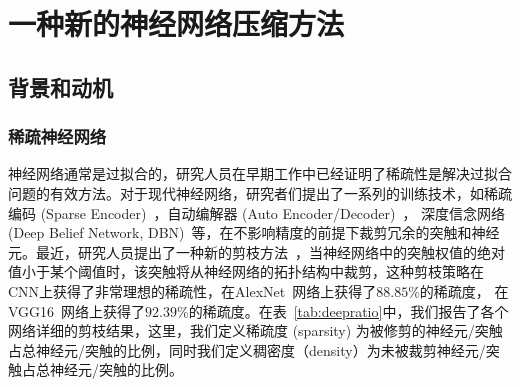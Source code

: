 \chapter{一种新的神经网络压缩方法}





\section{背景和动机}

\subsection{稀疏神经网络}
神经网络通常是过拟合的，研究人员在早期工作中已经证明了稀疏性是解决过拟合问题的有效方法。对于现代神经网络，研究者们提出了一系列的训练技术，如稀疏编码 (Sparse Encoder)~\cite{olshausen1996emergence}，自动编解器 (Auto Encoder/Decoder)~\cite{boureau2008sparse,lee2008sparse}， 深度信念网络 (Deep Belief Network, DBN)~\cite{lee2007efficient}等，在不影响精度的前提下裁剪冗余的突触和神经元。最近，研究人员提出了一种新的剪枝方法~\cite{han2015learning}，当神经网络中的突触权值的绝对值小于某个阈值时，该突触将从神经网络的拓扑结构中裁剪，这种剪枝策略在CNN上获得了非常理想的稀疏性，在AlexNet~\cite{krizhevsky2012imagenet}网络上获得了$88.85\%$的稀疏度， 在VGG16~\cite{simonyan2014very}网络上获得了$92.39\%$的稀疏度。在表~\ref{tab:deepratio}中，我们报告了各个网络详细的剪枝结果，这里，我们定义稀疏度 (sparsity) 为被修剪的神经元/突触占总神经元/突触的比例，同时我们定义稠密度（density）为未被裁剪神经元/突触占总神经元/突触的比例。


